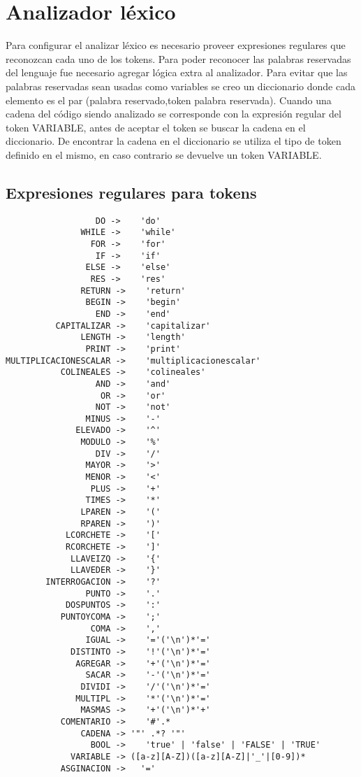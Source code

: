 \section{Analizador léxico }

Para configurar el analizar léxico es necesario proveer expresiones regulares que reconozcan cada uno de los tokens. Para poder reconocer las palabras reservadas del lenguaje  fue necesario agregar lógica extra al analizador. Para evitar que las palabras reservadas sean usadas como variables se creo un diccionario donde cada elemento es el par (palabra reservado,token palabra reservada). Cuando una cadena del código siendo analizado se corresponde con la expresión regular del token VARIABLE, antes de aceptar el token se buscar la cadena en el diccionario. De encontrar la cadena en el diccionario se utiliza el tipo de token definido en el mismo, en caso contrario se devuelve un token VARIABLE. 

\subsection{Expresiones regulares para tokens}

\begin{verbatim}
                  DO ->    'do'
               WHILE ->    'while'
                 FOR ->    'for'
                  IF ->    'if'
                ELSE ->    'else'
                 RES ->    'res'
               RETURN ->    'return'
                BEGIN ->    'begin'
                  END ->    'end'
          CAPITALIZAR ->    'capitalizar'
               LENGTH ->    'length'
                PRINT ->    'print'
MULTIPLICACIONESCALAR ->    'multiplicacionescalar'
           COLINEALES ->    'colineales'
                  AND ->    'and'
                   OR ->    'or'
                  NOT ->    'not'
                MINUS ->    '-'
              ELEVADO ->    '^'
               MODULO ->    '%'
                  DIV ->    '/'
                MAYOR ->    '>'
                MENOR ->    '<'
                 PLUS ->    '+'
                TIMES ->    '*'
               LPAREN ->    '('
               RPAREN ->    ')'
            LCORCHETE ->    '['
            RCORCHETE ->    ']'
             LLAVEIZQ ->    '{'
             LLAVEDER ->    '}'
        INTERROGACION ->    '?'
                PUNTO ->    '.'
            DOSPUNTOS ->    ':'
           PUNTOYCOMA ->    ';'
                 COMA ->    ','
                IGUAL ->    '='('\n')*'='
             DISTINTO ->    '!'('\n')*'='
              AGREGAR ->    '+'('\n')*'='
                SACAR ->    '-'('\n')*'='
               DIVIDI ->    '/'('\n')*'='
              MULTIPL ->    '*'('\n')*'='
               MASMAS ->    '+'('\n')*'+'
           COMENTARIO ->    '#'.*
               CADENA -> '"' .*? '"'
                 BOOL ->    'true' | 'false' | 'FALSE' | 'TRUE'
             VARIABLE -> ([a-z][A-Z])([a-z][A-Z]|'_'|[0-9])*
           ASGINACION ->   '='

\end{verbatim}
